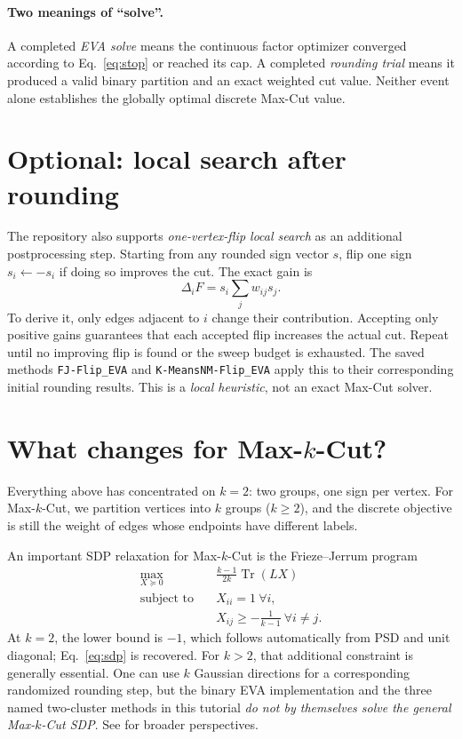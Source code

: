 \documentclass[10pt,letterpaper]{article}
\DeclareMathOperator{\Tr}{Tr}
\begin{document}
\paragraph{Two meanings of ``solve''.} A completed \emph{EVA solve} means the continuous factor optimizer converged according to Eq.~\eqref{eq:stop} or reached its cap. A completed \emph{rounding trial} means it produced a valid binary partition and an exact weighted cut value. Neither event alone establishes the globally optimal discrete Max-Cut value.

\section{Optional: local search after rounding}
\label{sec:flips}
The repository also supports \emph{one-vertex-flip local search} as an additional postprocessing step. Starting from any rounded sign vector $s$, flip one sign $s_i\gets-s_i$ if doing so improves the cut. The exact gain is
\begin{equation}\label{eq:flipgain}
 \Delta_i F=s_i\sum_jw_{ij}s_j.
\end{equation}
To derive it, only edges adjacent to $i$ change their contribution. Accepting only positive gains guarantees that each accepted flip increases the actual cut. Repeat until no improving flip is found or the sweep budget is exhausted. The saved methods \texttt{FJ-Flip\_EVA} and \texttt{K-MeansNM-Flip\_EVA} apply this to their corresponding initial rounding results. This is a \emph{local heuristic}, not an exact Max-Cut solver.

\section{What changes for Max-\texorpdfstring{$k$}{k}-Cut?}
\label{sec:maxk}
Everything above has concentrated on $k=2$: two groups, one sign per vertex. For Max-$k$-Cut, we partition vertices into \emph{$k$} groups ($k\ge2$), and the discrete objective is still the weight of edges whose endpoints have different labels.

An important SDP relaxation for Max-$k$-Cut is the Frieze--Jerrum program
\begin{equation}\label{eq:frieze-jerrum}
 \begin{aligned}
 \max_{X\succeq0}\quad&\frac{k-1}{2k}\Tr(LX)\\
 \text{subject to}\quad& X_{ii}=1\ \forall i,\\
 &X_{ij}\ge-\frac1{k-1}\ \forall i\ne j.
 \end{aligned}
\end{equation}
At $k=2$, the lower bound is $-1$, which follows automatically from PSD and unit diagonal; Eq.~\eqref{eq:sdp} is recovered. For $k>2$, that additional constraint is generally essential. One can use $k$ Gaussian directions for a corresponding randomized rounding step, but the binary EVA implementation and the three named two-cluster methods in this tutorial \emph{do not by themselves solve the general Max-$k$-Cut SDP}. See \cite{friezejerrum1997,jmlr2022} for broader perspectives.
\end{document}
